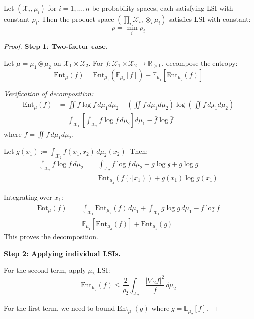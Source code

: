 \begin{theorem}
\label{thm:product-lsi-complete}
Let $(\mathcal{X}_i, \mu_i)$ for $i = 1, \ldots, n$ be probability spaces, each 
satisfying LSI with constant $\rho_i$. Then the product space 
$(\prod_i \mathcal{X}_i, \otimes_i \mu_i)$ satisfies LSI with constant:
\[
\rho = \min_i \rho_i
\]
\end{theorem}

\begin{proof}
\textbf{Step 1: Two-factor case.}

Let $\mu = \mu_1 \otimes \mu_2$ on $\mathcal{X}_1 \times \mathcal{X}_2$. 
For $f: \mathcal{X}_1 \times \mathcal{X}_2 \to \mathbb{R}_{>0}$, decompose the entropy:
\[
\text{Ent}_\mu(f) = \text{Ent}_{\mu_1}(\mathbb{E}_{\mu_2}[f]) + \mathbb{E}_{\mu_1}[\text{Ent}_{\mu_2}(f)]
\]

\textit{Verification of decomposition:}
\begin{align}
\text{Ent}_\mu(f) &= \iint f \log f \, d\mu_1 d\mu_2 - \left(\iint f \, d\mu_1 d\mu_2\right)\log\left(\iint f \, d\mu_1 d\mu_2\right) \\
&= \int_{\mathcal{X}_1} \left[\int_{\mathcal{X}_2} f \log f \, d\mu_2\right] d\mu_1 - \bar{f} \log \bar{f}
\end{align}
where $\bar{f} = \iint f \, d\mu_1 d\mu_2$.

Let $g(x_1) := \int_{\mathcal{X}_2} f(x_1, x_2) \, d\mu_2(x_2)$. Then:
\begin{align}
\int_{\mathcal{X}_2} f \log f \, d\mu_2 &= \int_{\mathcal{X}_2} f \log f \, d\mu_2 - g \log g + g \log g \\
&= \text{Ent}_{\mu_2}(f(\cdot | x_1)) + g(x_1) \log g(x_1)
\end{align}

Integrating over $x_1$:
\begin{align}
\text{Ent}_\mu(f) &= \int_{\mathcal{X}_1} \text{Ent}_{\mu_2}(f) \, d\mu_1 + \int_{\mathcal{X}_1} g \log g \, d\mu_1 - \bar{f} \log \bar{f} \\
&= \mathbb{E}_{\mu_1}[\text{Ent}_{\mu_2}(f)] + \text{Ent}_{\mu_1}(g)
\end{align}
This proves the decomposition.

\textbf{Step 2: Applying individual LSIs.}

For the second term, apply $\mu_2$-LSI:
\[
\text{Ent}_{\mu_2}(f) \leq \frac{2}{\rho_2} \int_{\mathcal{X}_2} \frac{|\nabla_2 f|^2}{f} \, d\mu_2
\]

For the first term, we need to bound $\text{Ent}_{\mu_1}(g)$ where $g = \mathbb{E}_{\mu_2}[f]$.


\end{proof}

